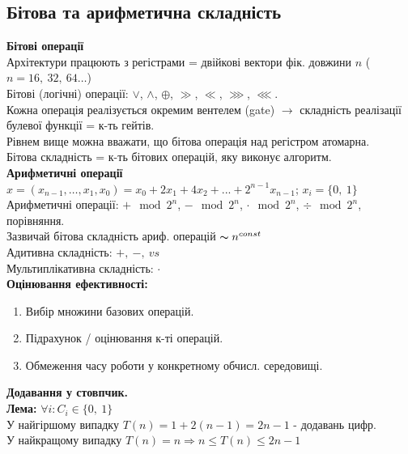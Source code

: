 \documentclass[a4paper,12pt]{article}
\begin{document}
    \subsection{Бітова та арифметична складність}
    \textbf{Бітові операції} \\
    Архітектури працюють з регістрами = двійкові вектори фік. довжини $n$ ($n=16,\:32,\:64\dots$) \\
    Бітові (логічні) операції: $\vee$, $\wedge$, $\oplus$, $\gg$, $\ll$, $\ggg$, $\lll$. \\
    Кожна операція реалізується окремим вентелем (gate) $\longrightarrow$
    складність реалізації булевої функції = к-ть гейтів. \\
    Рівнем вище можна вважати, що бітова операція над регістром атомарна. \\
    Бітова складність = к-ть бітових операцій, яку виконує алгоритм. \\
    \textbf{Арифметичні операції} \\
    $x=(x_{n-1},\dots,x_1,x_0)=x_0+2x_1+4x_2+...+2^{n-1}x_{n-1}$; $x_i=\{0,\:1\}$ \\
    Арифметичні операції: $+\mod2^n$, $-\mod2^n$, $\cdot\mod2^n$, $\div\mod2^n$, порівняння. \\
    Зазвичай бітова складність ариф. операцій $\thicksim n^{const}$ \\
    Адитивна складність: $+,\:-,\:vs$ \\
    Мультиплікативна складність: $\cdot$ \\

\newpage
    \textbf{Оцінювання ефективності:}
    \begin{enumerate}
        \item Вибір множини базових операцій.
        \item Підрахунок / оцінювання к-ті операцій.
        \item Обмеження часу роботи у конкретному обчисл. середовищі.
    \end{enumerate}
    \textbf{Додавання у стовпчик.} \\
    \textbf{Лема:} $\forall i:C_i\in\{0,\:1\}$ \\
    У найгіршому випадку $T(n)=1+2(n-1)=2n-1$ - додавань цифр. \\
    У найкращому випадку $T(n)=n\Rightarrow n\leqslant T(n)\leqslant2n-1$
\end{document}
